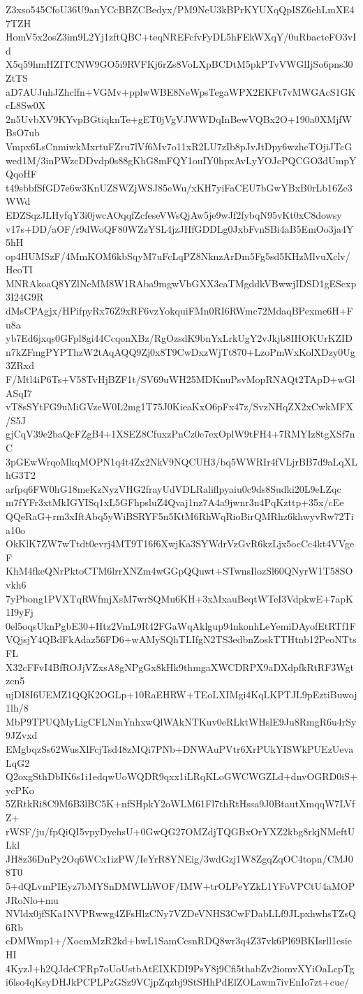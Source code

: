 Z3xso545CfoU36U9anYCcBBZCBedyx/PM9NeU3kBPrKYUXqQpISZ6ehLmXE47TZH
HomV5x2osZ3im9L2Yj1zftQBC+teqNREFcfvFyDL5hFEkWXqY/0uRbacteFO3vId
X5q59hmHZITCNW9GO5i9RVFKj6rZs8VoLXpBCDtM5pkPTvVWGlIjSo6pns30ZtTS
aD7AUJuhJZhclfn+VGMv+pplwWBE8NeWpsTegaWPX2EKFt7vMWGAcS1GKcL8Sw0X
2n5UvbXV9KYvpBGtiqknTe+gET0jVgVJWWDqInBewVQBx2O+190a0XMjfWBsO7ub
Vmpx6LsCnmiwkMxrtuFZru7lVf6Mv7o11xR2LU7zIb8pJvJtDpy6wzhcTOjiJTcG
wed1M/3inPWzcDDvdp0s88gKhG8mFQY1ouIY0hpxAvLyYOJcPQCGO3dUmpYQqoHF
t49sbbfSfGD7e6w3KnUZSWZjWSJ85eWu/xKH7yiFaCEU7bGwYBxB0rLb16Ze3WWd
EDZSqzJLHyfqY3i0jwcAOqqfZcfeseVWsQjAw5je9wJf2fybqN95vKt0xC8dowsy
v17s+DD/aOF/r9dWoQF80WZzYSL4jzJHfGDDLg0JxbFvnSBi4aB5EmOo3ja4Y5hH
op4HUMSzF/4MmKOM6kbSqyM7uFcLqPZ8NknzArDm5Fg5sd5KHzMlvuXclv/HeoTI
MNRAkoaQ8YZlNeMM8W1RAba9mgwVbGXX3caTMgddkVBwwjIDSD1gEScxp3I24G9R
dMsCPAgjx/HPifpyRx76Z9xRF6vzYokquiFMn0RI6RWmc72MdaqBPexme6H+Fu8a
yb7Ed6jxqs0GFpl8gi44CcqonXBz/RgOzsdK9bnYxLrkUgY2vJkjb8IHOKUrKZID
n7kZFmgPYPThzW2tAqAQQ9Zj0x8T9CwDxzWjTt870+LzoPmWxKolXDzy0Ug3ZRxd
F/Mtl4iP6Ts+V58TvHjBZF1t/SV69uWH25MDKnuPsvMopRNAQt2TApD+wGlASqI7
vT8sSYtFG9uMiGVzeW0L2mg1T75J0KieaKxO6pFx47z/SvzNHqZX2xCwkMFX/S5J
gjCqV39e2baQcFZgB4+1XSEZ8CfuxzPnCz0e7exOplW9tFH4+7RMYIz8tgXSf7nC
3pGEwWrqoMkqMOPN1q4t4Zx2NkV9NQCUH3/bq5WWRIr4fVLjrBB7d9aLqXLhG3T2
arfpq6FW0hG18meKzNyzVHG2frayUdVDLRaliflpyaiu0c9ds8Sudki20L9eLZqc
m7fYFr3xtMkIGYISq1xL5GFhpsluZ4Qvaj1nz7A4a9jwnr3n4PqKzttp+35x/cEe
QQeRaG+rm3xIftAbq5yWiBSRYF5n5KtM6RhWqRioBirQMRhz6khwyvRw72Tia10o
OkKlK7ZW7wTtdt0evrj4MT9T16f6XwjKa3SYWdrVzGvR6kzLjx5ocCc4kt4VVgeF
KhM4fkeQNrPktoCTM6lrrXNZm4wGGpQQuwt+STwnsIlozSl60QNyrW1T58SOvkh6
7yPbong1PVXTqRWfmjXsM7wrSQMu6KH+3xMxauBeqtWTeI3VdpkwE+7apK1I9yFj
0el5oqsUknPgbE30+Htz2VmL9R42FGaWqAklgup94nkonhLeYemiDAyofEtRTf1F
VQjsjY4QBdFkAdaz56FD6+wAMySQhTLIfgN2TS3edbnZoskTTHtnb12PeoNTtsFL
X32cFFvI4BfROJjVZxsA8gNPgGx8kHk9thmgaXWCDRPX9aDXdpfkRtRF3Wgtzcn5
ujDI8I6UEMZ1QQK2OGLp+10RaEHRW+TEoLXIMgi4KqLKPTJL9pEztiBuwoj1lh/8
MbP9TPUQMyLigCFLNmYnhxwQlWAkNTKuv0eRLktWHslE9Ju8RmgR6u4rSy9JZvxd
EMgbqzSs62WusXlFcjTsd48zMQi7PNb+DNWAuPVtr6XrPUkYISWkPUEzUevaLqG2
Q2oxgSthDbIK6s1i1edqwUoWQDR9qxx1iLRqKLoGWCWGZLd+dnvOGRD0iS+ycPKo
5ZRtkRi8C9M6B3lBC5K+nfSHpkY2oWLM61Fl7thRtHssa9J0BtautXmqqW7LVfZ+
rWSF/ju/fpQiQI5vpyDyehsU+0GwQG27OMZdjTQGBxOrYXZ2kbg8rkjNMeftULkl
JH8z36DnPy2Oq6WCx1izPW/IeYrR8YNEig/3wdGzj1W8ZgqZqOC4topn/CMJ08T0
5+dQLvmPIEyz7bMYSnDMWLhWOF/IMW+trOLPeYZkL1YFoVPCtU4aMOPJRoNlo+mu
NVldx0jfSKa1NVPRwwg4ZFsHlzCNy7VZDeVNHS3CwFDabLLf9JLpxhwhsTZsQ6Rb
cDMWmp1+/XocmMzR2kd+bwL1SamCcsnRDQ8wr3q4Z37vk6Pl69BKIsrll1esieHI
4KyzJ+h2QJdeCFRp7oUoUstbAtEIXKDI9PsY8j9Cfi5thabZv2iomvXYiOaLcpTg
i6lso4qKsyDHJkPCPLPzGSz9VCjpZqzbj9StSHhPdElZOLawm7ivEnIo7zt+cue/
